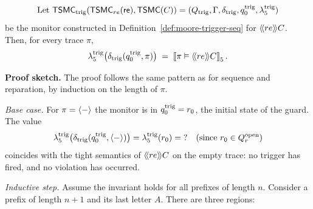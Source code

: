     \begin{lemma}
    \label{lem:trigg-correct}
    \[\text{Let } \tsmc_{\trigg}(\tsmc_{re}(\re),\tsmc(C))
          =(Q_{\trigg},\Gamma,\delta_{\trigg},q_0^{\trigg},\lambda_5^{\trigg})\]
    be the monitor constructed in Definition~\ref{def:moore-trigger-seq} for
    $\trig[re]{C}$.
    Then, for every trace $\pi$,
    \[
    \lambda_5^{\trigg}\bigl(\delta_{\trigg}(q_0^{\trigg},\pi)\bigr)
    \;=\;
    \semfive{\pi \vDash \trig[re]{C}}.
    \]
    \end{lemma}
    
    \noindent
    \textbf{Proof sketch.}
    The proof follows the same pattern as for sequence and reparation, by induction on the length of $\pi$.
    
    \smallskip
    \emph{Base case.}
    For $\pi=\emptytrace$ the monitor is in $q_0^{\trigg}=r_0$, the initial state
    of the guard.
    The value
    \[
    \lambda_5^{\trigg}\bigl(\delta_{\trigg}(q_0^{\trigg},\emptytrace)\bigr)
      = \lambda_5^{\trigg}(r_0) = \mathsf{?} \quad \text{(since } r_0 \in Q_r^{\text{open}}\text{)}
    \]
    coincides with the tight semantics of $\trig[re]{C}$ on the empty trace: no trigger has fired, and no violation has occurred.
    
    \smallskip
    \emph{Inductive step.}
    Assume the invariant holds for all prefixes of length $n$.
    Consider a prefix
    of length $n{+}1$ and its last letter $A$.
    There are three regions:
    
